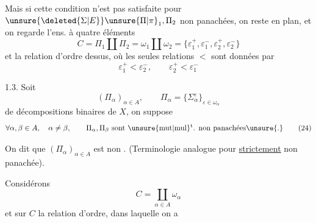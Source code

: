 \begingroup\makeatletter\tagsleft@true\makeatother
Mais si cette condition n'est pas satisfaite pour $\unsure{\deleted{\Sigma|E}}\unsure{\Pi|\pi}_1,\Pi_2$ non panachées, on reste en plan, et on regarde l'ens. à quatre éléments
\[
C=\Pi_1\amalg\Pi_2=\omega_1\amalg\omega_2
=\{\varepsilon_1^+,\varepsilon_1^-,\varepsilon_2^+,\varepsilon_2^-\}
\tag*{(17)}
\]
et la relation d'ordre dessus, où les seules relations $<$ sont données par
\[
\varepsilon_1^+<\varepsilon_2^-,\qquad\varepsilon_2^+<\varepsilon_1^-
\tag*{(22)}
\]

1.3. Soit 
\[
(\Pi_\alpha)_{\alpha\in A},\qquad \Pi_\alpha=\{\Sigma_\alpha^\varepsilon\}_{\varepsilon\in\omega_\alpha}
\tag*{(23)}
\]
   de décompositions binaires de $X$, on suppose 
\[
\forall\alpha,\beta\in A,\quad\alpha\ne\beta,\qquad
\Pi_\alpha,\Pi_\beta\ \text{sont \unsure{mut|mul}\textsuperscript{t}. non panachées\unsure{.}}
\tag*{(24)}
\]

 On dit  que $(\Pi_\alpha)_{\alpha\in A}$ est non . (Terminologie analogue pour \uline{strictement} non panachée).

Considérons
\[
C=\coprod_{\alpha\in A}\omega_\alpha
\tag*{(25)}
\]
et sur $C$ la relation d'ordre, dans laquelle on a
\endgroup
